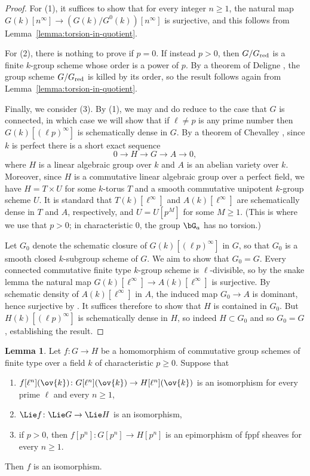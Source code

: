 \documentclass[11pt,reqno]{amsart}
\numberwithin{equation}{section}
\theoremstyle{definition}
\newtheorem{lemma}[thm]{Lemma}
\begin{document}
\begin{proof}
For (1), it suffices to show that for every integer $n \geq 1$, the natural map $G(k)[n^\infty] \to (G(k)/G^0(k))[n^\infty]$ is surjective, and this follows from Lemma~\ref{lemma:torsion-in-quotient}. \smallskip

For (2), there is nothing to prove if $p = 0$. If instead $p > 0$, then $G/G_{\rm{red}}$ is a finite $k$-group scheme whose order is a power of $p$. By a theorem of Deligne \cite[Sec.\ 1]{Oort-Tate}, the group scheme $G/G_{\rm{red}}$ is killed by its order, so the result follows again from Lemma~\ref{lemma:torsion-in-quotient}. \smallskip

Finally, we consider (3). By (1), we may and do reduce to the case that $G$ is connected, in which case we will show that if $\ell \neq p$ is any prime number then $G(k)[(\ell p)^\infty]$ is schematically dense in $G$. By a theorem of Chevalley \cite[Th.~1.1]{Conrad-Chevalley}, since $k$ is perfect there is a short exact sequence
\[
0 \to H \to G \to A \to 0,
\]
where $H$ is a linear algebraic group over $k$ and $A$ is an abelian variety over $k$. Moreover, since $H$ is a commutative linear algebraic group over a perfect field, we have $H = T \times U$ for some $k$-torus $T$ and a smooth commutative unipotent $k$-group scheme $U$. It is standard that $T(k)[\ell^\infty]$ and $A(k)[\ell^\infty]$ are schematically dense in $T$ and $A$, respectively, and $U = U[p^M]$ for some $M \geq 1$. (This is where we use that $p > 0$; in characteristic $0$, the group $\bG_a$ has no torsion.) \smallskip

Let $G_0$ denote the schematic closure of $G(k)[(\ell p)^\infty]$ in $G$, so that $G_0$ is a smooth closed $k$-subgroup scheme of $G$. We aim to show that $G_0 = G$. Every connected commutative finite type $k$-group scheme is $\ell$-divisible, so by the snake lemma the natural map $G(k)[\ell^\infty] \to A(k)[\ell^\infty]$ is surjective. By schematic density of $A(k)[\ell^\infty]$ in $A$, the induced map $G_0 \to A$ is dominant, hence surjective by \cite[Exp.\ VI\textsubscript{B}, Prop.\ 1.2]{SGA3}.
It suffices therefore to show that $H$ is contained in $G_0$. But $H(k)[(\ell p)^\infty]$ is schematically dense in $H$, so indeed $H \subset G_0$ and so $G_0 = G$, establishing the result.
\end{proof}

\begin{lemma}\label{lemma:isomorphism-criterion}
Let $f\colon G \to H$ be a homomorphism of commutative group schemes of finite type over a field $k$ of characteristic $p \geq 0$. Suppose that
\begin{enumerate}
    \item $f[\ell^n](\ov{k})\colon G[\ell^n](\ov{k}) \to H[\ell^n](\ov{k})$ is an isomorphism for every prime $\ell$ and every $n \geq 1$,
    \item $\Lie f\colon \Lie G \to \Lie H$ is an isomorphism,
    \item if $p > 0$, then $f[p^n]\colon G[p^n] \to H[p^n]$ is an epimorphism of fppf sheaves for every $n \geq 1$.
\end{enumerate}
Then $f$ is an isomorphism.
\end{lemma}
\end{document}
